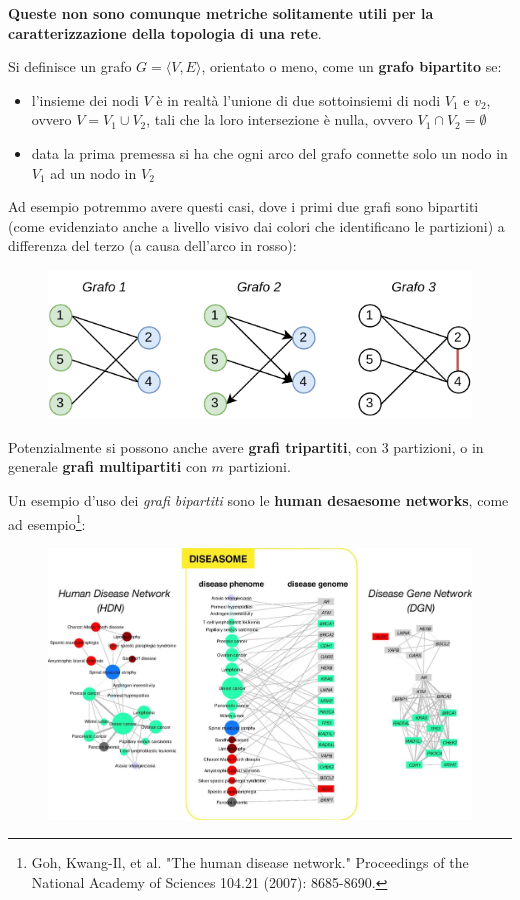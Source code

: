 \documentclass[a4paper,12pt, oneside]{book}
\begin{document}
\textbf{Queste non sono comunque metriche solitamente utili per la
  caratterizzazione della topologia di una rete}.
\begin{definizione}
  Si definisce un grafo $G=\langle V,E\rangle$, orientato o meno, come un
  \textbf{grafo bipartito} se:
  \begin{itemize}
    \item l'insieme dei nodi $V$ è in realtà l'unione di due sottoinsiemi di
    nodi $V_1$ e $v_2$, ovvero $V=V_1\cup V_2$, tali che la loro intersezione è
    nulla, ovvero $V_1\cap V_2=\emptyset$
    \item data la prima premessa si ha che ogni arco del grafo connette solo un
    nodo in $V_1$ ad un nodo in $V_2$
  \end{itemize}
  Ad esempio potremmo avere questi casi, dove i primi due grafi sono bipartiti
  (come evidenziato anche a livello visivo dai colori che identificano le
  partizioni) a differenza del terzo (a causa dell'arco in rosso):
  \begin{figure}[H]
    \centering
    \includegraphics[scale = 1.3]{img/bip.pdf}
  \end{figure}
  Potenzialmente si possono anche avere \textbf{grafi tripartiti}, con 3
  partizioni, o in generale \textbf{grafi multipartiti} con $m$ partizioni.
\end{definizione}
\newpage
Un esempio d'uso dei \textit{grafi bipartiti} sono le \textbf{human desaesome
  networks}, come ad esempio\footnote{Goh, Kwang-Il, et al. "The
  human disease network." Proceedings of the National Academy of Sciences 104.21
  (2007): 8685-8690.}:
\begin{figure}[H]
  \centering
  \includegraphics[scale = 0.7]{img/bi.jpg}
  \label{fig:mbip}
\end{figure}
\end{document}
